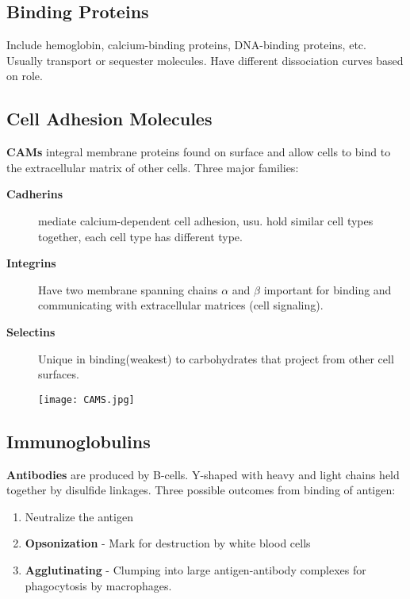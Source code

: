 \documentclass[../Bio_chemistryReview.tex]{subfiles}
\begin{document}
	\subsection{Binding Proteins\supdag} 
	
	Include hemoglobin, calcium-binding proteins, DNA-binding proteins, etc. Usually transport or sequester molecules. Have different dissociation curves based on role.
	
	\subsection{Cell Adhesion Molecules\supdag}
	
	\textbf{CAMs} integral membrane proteins found on surface and allow cells to bind to the extracellular matrix of other cells. Three major families:
	\begin{description}
		\item[\textbf{Cadherins}] mediate calcium-dependent cell adhesion, usu. hold similar cell types together, each cell type has different type.
		\item[\textbf{Integrins}] Have two membrane spanning chains $ \alpha $ and $ \beta $ important for binding and communicating with extracellular matrices (cell signaling).
		\item[\textbf{Selectins}] Unique in binding(weakest) to carbohydrates that project from other cell surfaces.
	\end{description}
	
	\begin{figure}[h]
		\centering
		\texttt{[image: CAMS.jpg]}
	\end{figure}
	
	\subsection{Immunoglobulins\supdag}
	
	\textbf{Antibodies} are produced by B-cells. Y-shaped with heavy and light chains held together by disulfide linkages. Three possible outcomes from binding of antigen:
	\begin{enumerate}
		\item Neutralize the antigen
		\item \textbf{Opsonization} - Mark for destruction by white blood cells
		\item \textbf{Agglutinating} - Clumping into large antigen-antibody complexes for phagocytosis by macrophages.
	\end{enumerate}
	
\end{document}
